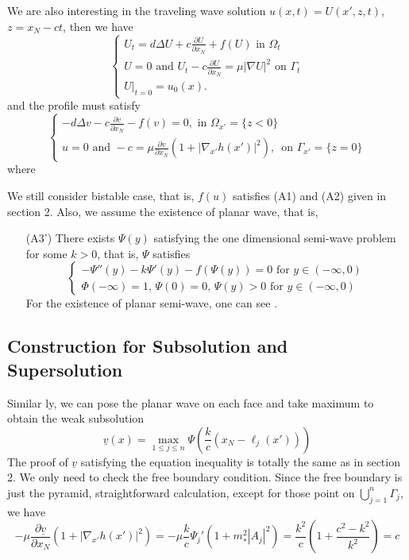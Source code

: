 \documentclass[12pt, a4paper]{article}
\numberwithin{equation}{section}
\newcommand{\pd}[2]{\frac{\partial #1}{\partial #2}}
\begin{document}
\begin{CJK}{UTF8}{bkai}
We are also interesting in the traveling wave solution $u(x,t)=U(x',z,t)$, $z=x_N-ct$, then we have
\begin{equation}\label{iden3.2}
\begin{cases}
	U_t=d\Delta U+c\pd{U}{x_N}+f(U)\mbox{ in }\Omega_t\\
	U=0\mbox{ and }U_t-c\pd{U}{x_N}=\mu|\nabla U|^2\mbox{ on }\Gamma_t\\
	U|_{t=0}=u_0(x).
\end{cases}
\end{equation}
and the profile must satisfy
\begin{equation}\label{iden3.3}
\begin{cases}
	-d\Delta v-c\pd{v}{x_N}-f(v)=0,\mbox{ in }\Omega_{x'}=\{z<0\}\\
	u=0\mbox{ and }-c=\mu\pd{v}{x_N}(1+|\nabla_{x'}h(x')|^2),\,\mbox{ on }\Gamma_{x'}=\{z=0\}
\end{cases}
\end{equation}
where

	We still consider bistable case, that is,  $f(u)$ satisfies (A1) and (A2) given in section 2. Also, we assume the existence of planar wave, that is,
\begin{enumerate}
	\item[(A3')] There exists $\Psi(y)$ satisfying the one dimensional semi-wave problem for some $k>0$, that is, $\Psi$ satisfies
	\begin{equation}
	\begin{cases}
		-\Psi''(y)-k\Psi'(y)-f(\Psi(y))=0\mbox{ for }y\in(-\infty,0)\\
		\Phi(-\infty)=1,\,\Psi(0)=0,\,\Psi(y)>0\mbox{ for }y\in(-\infty,0)
	\end{cases}
	\end{equation}
For the existence of planar semi-wave, one can see \cite[Proposition 1.8]{DL2013}.
\end{enumerate}


\subsection{Construction for Subsolution and Supersolution}

Similar ly, we can pose the planar wave on each face and take maximum to obtain the weak subsolution
\begin{equation}
	\underline{v}(x)=\max_{1\leq j\leq n}\Psi\left(\frac{k}{c}(x_N-\ell_j(x'))\right)
\end{equation}
The proof of $\underline{v}$ satisfying the equation inequality is totally the same as in section 2. We only need to check the free boundary condition. Since the free boundary is just the pyramid, straightforward calculation,  except for those point on $\bigcup\limits_{j=1}^n\Gamma_j$, we have
\[
	-\mu\pd{\underline{v}}{x_N}(1+|\nabla_{x'} h(x')|^2)=-\mu\frac{k}{c}\Psi_j'(1+m_*^2|A_j|^2)=\frac{k^2}{c}(1+\frac{c^2-k^2}{k^2})=c
\]



\end{CJK}
\end{document}
